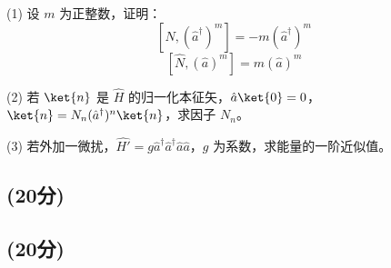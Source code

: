 (1) 设 $m$ 为正整数，证明：
$$[\hat{N}, (\hat{a}^\dagger)^m] = -m(\hat{a}^\dagger)^m~$$ 
$$[\hat{N}, (\hat{a})^m] = m(\hat{a})^m~$$

(2) 若 $\ket{n}$ 是 $\hat{H}$ 的归一化本征矢，$\hat{a}\ket{0} = 0$，$\ket{n} = N_n ( \hat{a}^\dagger )^n\ket{n}$，求因子 $N_n$。

(3) 若外加一微扰，$\hat{H'} = g\hat{a}^\dagger \hat{a}^\dagger \hat{a} \hat{a}$，$g$ 为系数，求能量的一阶近似值。
\subsection{(20分)}

\subsection{(20分)}